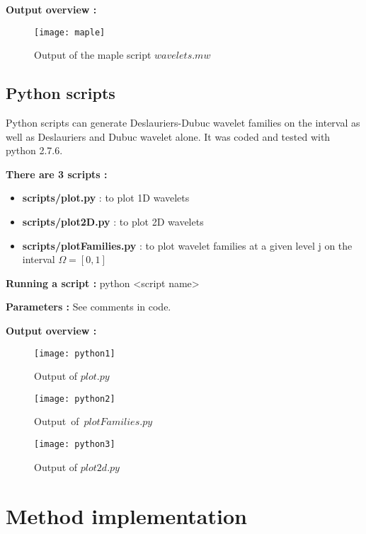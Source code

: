 \vskip 0.3cm
{\large \textbf{Output overview :}}

\begin{figure}[H]
    \centering
   \texttt{[image: maple]}
   \caption{Output of the maple script $wavelets.mw$}
\end{figure}

\clearpage
\subsection{Python scripts}

    Python scripts can generate Deslauriers-Dubuc wavelet families on the interval as well as Deslauriers and Dubuc wavelet alone.
    It was coded and tested with python 2.7.6.

\vskip 0.3cm
    
    {\large \textbf{There are 3 scripts :}}

    \begin{itemize}
        \item \textbf{scripts/plot.py} : to plot 1D wavelets
        \item \textbf{scripts/plot2D.py} : to plot 2D wavelets
        \item \textbf{scripts/plotFamilies.py} : to plot wavelet families at a given level j on the interval $\Omega = [0,1]$
    \end{itemize}

\vskip 0.3cm
{\large \textbf{Running a script :}} \textrm{\tild python <script name>}

\vskip 0.3cm
{\large \textbf{Parameters :}} See comments in code.

\vskip 0.3cm
{\large \textbf{Output overview :}}

\begin{figure}[H]
    \centering
    \parbox{7cm}{
        \texttt{[image: python1]}
        \caption{Output of $plot.py$}
    }
    \qquad
    \begin{minipage}{7cm}
        \texttt{[image: python2]}
        \caption{Output~of~$plotFamilies.py$}
    \end{minipage}
\end{figure}

\begin{figure}[H]
    \centering
   \texttt{[image: python3]}
   \caption{Output of $plot2d.py$}
\end{figure}

\clearpage
\section{Method implementation}

